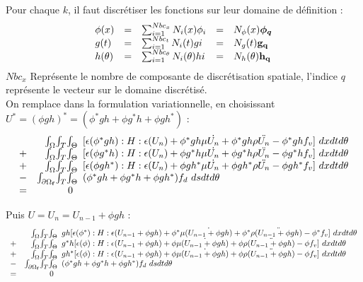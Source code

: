 Pour chaque $k$, il faut discrétiser les fonctions sur leur domaine de définition : 
\begin{equation}
	\begin{array}{l c l c l}
		\phi(x) &=& \sum_{i=1}^{Nbc_x}  N_i (x) \phi_i &=& N_\phi(x) \boldsymbol{\phi_q}
		\\
		g(t) &=& \sum_{i=1}^{Nbc_t}  N_i (t) gi &=& N_g(t) \mathbf{g_q}
		\\
		h(\theta) &=& \sum_{i=1}^{Nbc_\theta}  N_i (\theta) hi 
		&=& N_h(\theta) \mathbf{h_q}
	\end{array}
\end{equation}
$Nbc_x$ Représente le nombre de composante de discrétisation spatiale, l'indice $q$ représente le vecteur sur le domaine discrétisé.
\\
On remplace dans la formulation variationnelle, en choisissant $U^* = (\phi gh)^* = ( \phi^*gh+\phi g^*h+\phi gh^*) $ :
\begin{equation}
\begin{array}{r r l}
	&\int_\Omega \! \int_T \! \int_\Theta \!\!\!&		
		[\epsilon (\phi^*gh) : H : \epsilon (U_n)
			+ \phi^*gh \mu \dot{U_n} 
			+ \phi^*gh \rho \ddot{U_n}
			- \phi^*gh f_v
			] ~dx dt d\theta
	\\
	+ &\int_\Omega \! \int_T \! \int_\Theta \!\!\!&		
		[\epsilon (\phi g^*h) : H : \epsilon (U_n)
			+ \phi g^*h \mu \dot{U_n} 
			+ \phi g^*h \rho \ddot{U_n}
			- \phi g^*h f_v
			] ~dx dt d\theta
	\\
	+ &\int_\Omega \! \int_T \! \int_\Theta \!\!\!&		
		[\epsilon (\phi gh^*) : H : \epsilon (U_n)
			+ \phi gh^* \mu \dot{U_n} 
			+ \phi gh^* \rho \ddot{U_n}
			- \phi gh^* f_v
			] ~dx dt d\theta
	\\
	- &\int_{\partial \Omega_\mathbf{f}} \! \int_T \! \int_\Theta \!\!\!&
		(\phi^*gh + \phi g^*h + \phi gh^*) f_d  ~ds dt d\theta
\\
	= &0& 
\end{array}
\end{equation}

Puis $U = U_{n} = U_{n-1} + \phi gh$ :
\begin{equation}
\begin{array}{r r l}
	&\int_\Omega \! \int_T \! \int_\Theta \!\!\!&		
		gh[\epsilon (\phi^*) : H : \epsilon (U_{n-1} + \phi gh)
			+ \phi^* \mu \dot{(U_{n-1} + \phi gh)} 
			+ \phi^* \rho \ddot{(U_{n-1} + \phi gh)}
			- \phi^* f_v
			] ~dx dt d\theta
	\\
	+ &\int_\Omega \! \int_T \! \int_\Theta \!\!\!&		
		g^*h[\epsilon (\phi) : H : \epsilon (U_{n-1} + \phi gh)
			+ \phi \mu \dot{(U_{n-1} + \phi gh)} 
			+ \phi \rho \ddot{(U_{n-1} + \phi gh)}
			- \phi f_v
			] ~dx dt d\theta
	\\
	+ &\int_\Omega \! \int_T \! \int_\Theta \!\!\!&		
		gh^*[\epsilon (\phi) : H : \epsilon (U_{n-1} + \phi gh)
			+ \phi \mu \dot{(U_{n-1} + \phi gh)} 
			+ \phi \rho \ddot{(U_{n-1} + \phi gh)}
			- \phi f_v
			] ~dx dt d\theta
	\\
	- &\int_{\partial \Omega_\mathbf{f}} \! \int_T \! \int_\Theta \!\!\!&
		(\phi^*gh + \phi g^*h + \phi gh^*) f_d  ~ds dt d\theta
\\
	= &0& 
\end{array}
\end{equation}

